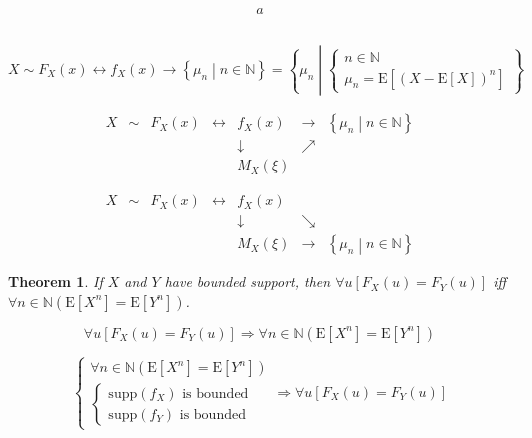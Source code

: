 \documentclass[
]{book}
\newtheorem{theorem}{Theorem}[chapter]
\theoremstyle{definition}
\theoremstyle{definition}
\theoremstyle{definition}
\theoremstyle{definition}
\theoremstyle{remark}
\begin{document}
\[
\begin{aligned}
a
\end{aligned}
\]

\[
\tag*{$\Box$}
\]

\[
X\sim F_{{\scriptscriptstyle X}}\left(x\right)\leftrightarrow f_{{\scriptscriptstyle X}}\left(x\right)\rightarrow\left\{ \mu_{{\scriptscriptstyle n}}\middle|n\in\mathbb{N}\right\} =\left\{ \mu_{{\scriptscriptstyle n}}\middle|\begin{cases}
n\in\mathbb{N}\\
\mu_{{\scriptscriptstyle n}}=\mathrm{E}\left[\left(X-\mathrm{E}\left[X\right]\right)^{n}\right]
\end{cases}\right\} 
\]

\[
\begin{array}{ccccccc}
X & \sim & F_{{\scriptscriptstyle X}}\left(x\right) & \leftrightarrow & f_{{\scriptscriptstyle X}}\left(x\right) & \rightarrow & \left\{ \mu_{{\scriptscriptstyle n}}\middle|n\in\mathbb{N}\right\} \\
 &  &  &  & \downarrow & \nearrow\\
 &  &  &  & M_{{\scriptscriptstyle X}}\left(\xi\right)
\end{array}
\]

\[
\begin{array}{ccccccc}
X & \sim & F_{{\scriptscriptstyle X}}\left(x\right) & \leftrightarrow & f_{{\scriptscriptstyle X}}\left(x\right)\\
 &  &  &  & \downarrow & \searrow\\
 &  &  &  & M_{{\scriptscriptstyle X}}\left(\xi\right) & \rightarrow & \left\{ \mu_{{\scriptscriptstyle n}}\middle|n\in\mathbb{N}\right\} 
\end{array}
\]

\begin{theorem}
\protect\hypertarget{thm:unnamed-chunk-28}{}\label{thm:unnamed-chunk-28}If \(X\) and \(Y\) have bounded support, then \(\forall u\left[F_{{\scriptscriptstyle X}}\left(u\right)=F_{{\scriptscriptstyle Y}}\left(u\right)\right]\) iff \(\forall n\in\mathbb{N}\left(\mathrm{E}\left[X^{n}\right]=\mathrm{E}\left[Y^{n}\right]\right)\).
\end{theorem}

\[
\forall u\left[F_{{\scriptscriptstyle X}}\left(u\right)=F_{{\scriptscriptstyle Y}}\left(u\right)\right]\Rightarrow\forall n\in\mathbb{N}\left(\mathrm{E}\left[X^{n}\right]=\mathrm{E}\left[Y^{n}\right]\right)
\]

\[
\begin{cases}
\forall n\in\mathbb{N}\left(\mathrm{E}\left[X^{n}\right]=\mathrm{E}\left[Y^{n}\right]\right)\\
\begin{cases}
\mathrm{supp}\left(f_{{\scriptscriptstyle X}}\right)\text{ is bounded}\\
\mathrm{supp}\left(f_{{\scriptscriptstyle Y}}\right)\text{ is bounded}
\end{cases}
\end{cases}\Rightarrow \forall u\left[F_{{\scriptscriptstyle X}}\left(u\right)=F_{{\scriptscriptstyle Y}}\left(u\right)\right]
\]
\end{document}
